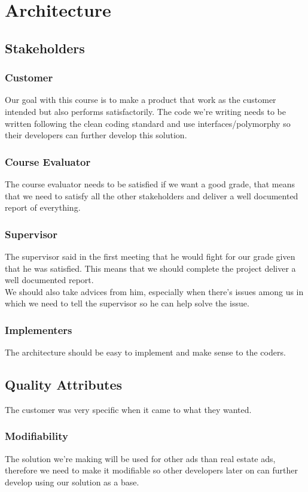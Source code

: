 \section{Architecture}

\subsection{Stakeholders}

\subsubsection{Customer}
Our goal with this course is to make a product that work as the customer intended but also performs satisfactorily. The code we're writing needs to be written following the clean coding standard and use interfaces/polymorphy so their developers can further develop this solution.

\subsubsection{Course Evaluator}
The course evaluator needs to be satisfied if we want a good grade, that means that we need to satisfy all the other stakeholders and deliver a well documented report of everything.

\subsubsection{Supervisor}
The supervisor said in the first meeting that he would fight for our grade given that he was satisfied. This means that we should complete the project deliver a well documented report. \\ We should also take advices from him, especially when there's issues among us in which we need to tell the supervisor so he can help solve the issue.
\subsubsection{Implementers}
The architecture should be easy to implement and make sense to the coders.

\subsection{Quality Attributes}
The customer was very specific when it came to what they wanted.
\subsubsection{Modifiability}
The solution we're making will be used for other ads than real estate ads, therefore we need to make it modifiable so other developers later on can further develop using our solution as a base.
